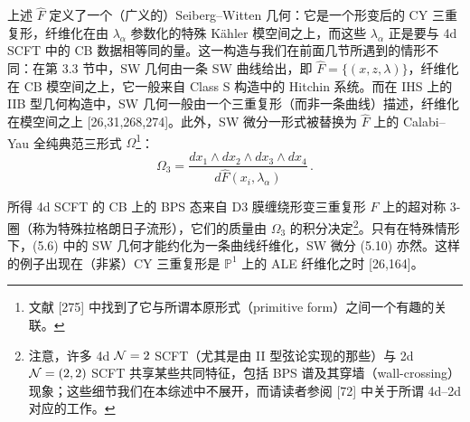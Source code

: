 
  上述 $\hat F$ 定义了一个（广义的）Seiberg--Witten 几何：它是一个形变后的 CY 三重复形，纤维化在由 $\lambda_{\alpha}$ 参数化的特殊 Kähler 模空间之上，而这些 $\lambda_{\alpha}$ 正是要与 4d SCFT 中的 CB 数据相等同的量。这一构造与我们在前面几节所遇到的情形不同：在第 3.3 节中，SW 几何由一条 SW 曲线给出，即 $\hat F=\{(x,z,\lambda)\}$，纤维化在 CB 模空间之上，它一般来自 Class S 构造中的 Hitchin 系统。而在 IHS 上的 IIB 型几何构造中，SW 几何一般由一个三重复形（而非一条曲线）描述，纤维化在模空间之上 [26,31,268,274]。此外，SW 微分一形式被替换为 $\hat F$ 上的 Calabi--Yau 全纯典范三形式 $\Omega$\footnote{文献 [275] 中找到了它与所谓本原形式（primitive form）之间一个有趣的关联。}：
  \begin{equation}
    \Omega_3 = \frac{dx_1\wedge dx_2\wedge dx_3\wedge dx_4}{d\hat F(x_i,\lambda_{\alpha})}\,.
    \tag{5.10}
  \end{equation}


  所得 4d SCFT 的 CB 上的 BPS 态来自 D3 膜缠绕形变三重复形 $\hat F$ 上的超对称 3-圈（称为特殊拉格朗日子流形），它们的质量由 $\Omega_3$ 的积分决定\footnote{注意，许多 4d $\mathcal{N}=2$ SCFT（尤其是由 II 型弦论实现的那些）与 2d $\mathcal{N}=(2,2)$ SCFT 共享某些共同特征，包括 BPS 谱及其穿墙（wall-crossing）现象；这些细节我们在本综述中不展开，而请读者参阅 [72] 中关于所谓 4d--2d 对应的工作。}。只有在特殊情形下，(5.6) 中的 SW 几何才能约化为一条曲线纤维化，SW 微分 (5.10) 亦然。这样的例子出现在（非紧）CY 三重复形是 $\mathbb{P}^1$ 上的 ALE 纤维化之时 [26,164]。

